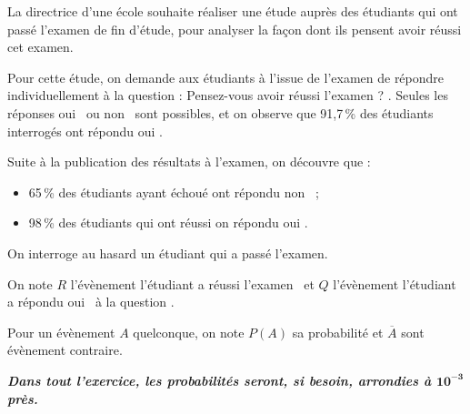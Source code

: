 La directrice d'une école souhaite réaliser une étude auprès des étudiants qui ont passé l'examen de fin d'étude, pour analyser la façon dont ils pensent avoir réussi cet examen.

\smallskip

Pour cette étude, on demande aux étudiants à l'issue de l'examen de répondre individuellement à la question : \og Pensez-vous avoir réussi l'examen ? \fg. Seules les réponses \og oui \fg\ ou \og non \fg\ sont possibles, et on observe que 91,7\,\% des étudiants interrogés ont répondu \og oui \fg.

\smallskip

Suite à la publication des résultats à l'examen, on découvre que :

\begin{itemize}
	\item 65\,\% des étudiants ayant échoué ont répondu \og non \fg\ ;
	\item 98\,\% des étudiants qui ont réussi on répondu \og oui \fg.
\end{itemize}

On interroge au hasard un étudiant qui a passé l'examen.

\smallskip

On note $R$ l'évènement \og l'étudiant a réussi l'examen \fg\ et $Q$ l'évènement \og l'étudiant a répondu \og oui \fg\ à la question \fg.

\smallskip

Pour un évènement $A$ quelconque, on note $P(A)$ sa probabilité et $\overline{A}$ sont évènement contraire.

\medskip

\textit{\textbf{Dans tout l'exercice, les probabilités seront, si besoin, arrondies à $\bm{10^{-3}}$ près.}}

\begin{wrapstuff}[r]
\end{wrapstuff}

